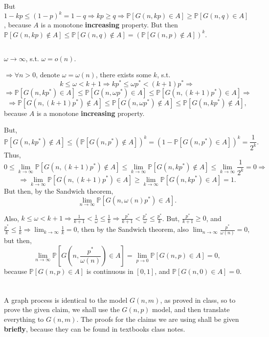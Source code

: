 \documentclass{article}
\begin{document}
But $1-kp\leq(1-p)^k=1-q\Rightarrow{kp\geq{q}}\Rightarrow\mathbb{P}[G(n,kp)\in{A}]\geq\mathbb{P}[G(n,q)\in{A}]$, because $A$ is a monotone \textbf{increasing} property. But then $\mathbb{P}[G(n,kp)\notin{A}]\leq\mathbb{P}[G(n,q)\notin{A}]=(\mathbb{P}[G(n,p)\notin{A}])^k$.
\subsection{}
$\omega\rightarrow\infty$, s.t. $\omega=o(n)$.

$\Rightarrow\forall{n>0}$, denote $\omega=\omega(n)$, there exists some $k$, s.t. 
\[k\leq\omega<k+1\Rightarrow{k}p^\ast\leq\omega{p^\ast}<(k+1)p^\ast\Rightarrow\]\[\Rightarrow\mathbb{P}[G(n,kp^\ast)\in{A}]\leq\mathbb{P}[G(n,\omega{p^\ast})\in{A}]\leq\mathbb{P}[G(n,(k+1)p^\ast)\in{A}]\Rightarrow\]\[\Rightarrow\mathbb{P}[G(n,(k+1)p^\ast)\notin{A}]\leq\mathbb{P}[G(n,\omega{p^\ast})\notin{A}]\leq\mathbb{P}[G(n,kp^\ast)\notin{A}],\] because $A$ is a monotone \textbf{increasing} property.

But, 
\[\mathbb{P}[G(n,kp^\ast)\notin{A}]\leq(\mathbb{P}[G(n,p^\ast)\notin{A}])^k=(1-\mathbb{P}[G(n,p^\ast)\in{A}])^k=\frac{1}{2^k}.\]
Thus, 
\[0\leq\lim_{k\rightarrow\infty}\mathbb{P}[G(n,(k+1)p^\ast)\notin{A}]\leq\lim_{k\rightarrow\infty}\mathbb{P}[G(n,kp^\ast)\notin{A}]\leq\lim_{k\rightarrow\infty}\frac{1}{2^k}=0\Rightarrow\]\[\Rightarrow\lim_{k\rightarrow\infty}\mathbb{P}[G(n,(k+1)p^\ast)\in{A}]\geq\lim_{k\rightarrow\infty}\mathbb{P}[G(n,kp^\ast)\in{A}]=1.\]
But then, by the Sandwich theorem, 
\[\lim_{n\rightarrow\infty}\mathbb{P}[G(n,\omega(n)p^\ast)\in{A}].\]

Also, $k\leq\omega<k+1\Rightarrow\frac{1}{k+1}<\frac{1}{\omega}\leq\frac{1}{k}\Rightarrow\frac{p^\ast}{k+1}<\frac{p^\ast}{\omega}\leq\frac{p^\ast}{k}$.
But,
$\frac{p^\ast}{k+1}\geq{0}$, and $\frac{p^\ast}{k}\leq\frac{1}{k}\Rightarrow\lim_{k\rightarrow\infty}\frac{1}{k}=0$, then by the Sandwich theorem, also $\lim_{n\rightarrow\infty}\frac{p^\ast}{\omega(n)}=0$, but then,
\[\lim_{n\rightarrow\infty}\mathbb{P}[G(n,\frac{p^\ast}{\omega(n)})\in{A}]=\lim_{p\rightarrow{0}}\mathbb{P}[G(n,p)\in{A}]=0,\]
because $\mathbb{P}[G(n,p)\in{A}]$ is continuous in $[0,1]$, and $\mathbb{P}[G(n,0)\in{A}]=0$.
\section{}
A graph process is identical to the model $G(n,m)$, as proved in class, so to prove the given claim, we shall use the $G(n,p)$ model, and then translate everything to $G(n,m)$. The proofs for the claims we are using shall be given \textbf{briefly}, because they can be found in textbooks class notes.
\end{document}
